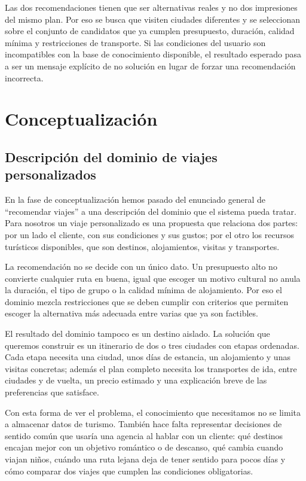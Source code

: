 \documentclass[11pt,a4paper]{article}
\begin{document}
Las dos recomendaciones tienen que ser alternativas reales y no dos
impresiones del mismo plan. Por eso se busca que visiten ciudades diferentes y
se seleccionan sobre el conjunto de candidatos que ya cumplen presupuesto,
duraci\'on, calidad m\'inima y restricciones de transporte. Si las condiciones
del usuario son incompatibles con la base de conocimiento disponible, el
resultado esperado pasa a ser un mensaje expl\'icito de no soluci\'on en lugar de
forzar una recomendaci\'on incorrecta.

\section{Conceptualizaci\'on}
\subsection{Descripci\'on del dominio de viajes personalizados}
En la fase de conceptualizaci\'on hemos pasado del enunciado general de
``recomendar viajes'' a una descripci\'on del dominio que el sistema pueda
tratar. Para nosotros un viaje personalizado es una propuesta que relaciona
dos partes: por un lado el cliente, con sus condiciones y sus gustos; por el
otro los recursos tur\'isticos disponibles, que son destinos, alojamientos,
visitas y transportes.

La recomendaci\'on no se decide con un \'unico dato. Un presupuesto alto no
convierte cualquier ruta en buena, igual que escoger un motivo cultural no
anula la duraci\'on, el tipo de grupo o la calidad m\'inima de alojamiento. Por
eso el dominio mezcla restricciones que se deben cumplir con criterios que
permiten escoger la alternativa m\'as adecuada entre varias que ya son
factibles.

El resultado del dominio tampoco es un destino aislado. La soluci\'on que
queremos construir es un itinerario de dos o tres ciudades con etapas
ordenadas. Cada etapa necesita una ciudad, unos d\'ias de estancia, un
alojamiento y unas visitas concretas; adem\'as el plan completo necesita los
transportes de ida, entre ciudades y de vuelta, un precio estimado y una
explicaci\'on breve de las preferencias que satisface.

Con esta forma de ver el problema, el conocimiento que necesitamos no se
limita a almacenar datos de turismo. Tambi\'en hace falta representar
decisiones de sentido com\'un que usar\'ia una agencia al hablar con un cliente:
qu\'e destinos encajan mejor con un objetivo rom\'antico o de descanso, qu\'e
cambia cuando viajan ni\~nos, cu\'ando una ruta lejana deja de tener sentido
para pocos d\'ias y c\'omo comparar dos viajes que cumplen las condiciones
obligatorias.
\end{document}
